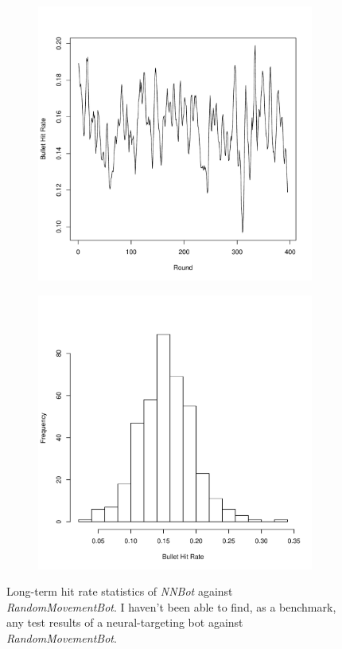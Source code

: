 \documentclass[11pt,a4paper]{article}
\begin{document}
\begin{figure}[htb]
	\centering
	\begin{subfigure}
		\centering
		\includegraphics[scale=0.4]{random_line.pdf}
	\end{subfigure}
	\begin{subfigure}
		\centering
		\includegraphics[scale=0.4]{random_hist.pdf}
	\end{subfigure}
	\caption{Long-term hit rate statistics of \emph{NNBot} against \emph{RandomMovementBot}. I haven't been able to find, as a benchmark, any test results of a neural-targeting bot against \emph{RandomMovementBot}.}
	\label{fig:random}
\end{figure}
\end{document}
